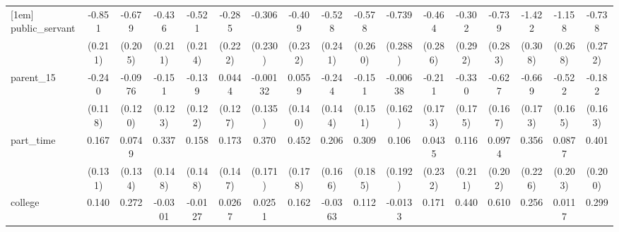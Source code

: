 {\begin{tabular}{l*{16}{c}}
[1em]
public\_servant      &      -0.851\sym{***}&      -0.679\sym{***}&      -0.436\sym{*}  &      -0.521\sym{*}  &      -0.285         &      -0.306         &      -0.409         &      -0.528\sym{*}  &      -0.578\sym{*}  &      -0.739\sym{*}  &      -0.464         &      -0.302         &      -0.739\sym{**} &      -1.422\sym{***}&      -1.158\sym{***}&      -0.738\sym{**} \\
                    &     (0.211)         &     (0.205)         &     (0.211)         &     (0.214)         &     (0.222)         &     (0.230)         &     (0.232)         &     (0.241)         &     (0.260)         &     (0.288)         &     (0.286)         &     (0.292)         &     (0.283)         &     (0.308)         &     (0.268)         &     (0.272)         \\
[1em]
parent\_15           &      -0.240\sym{*}  &     -0.0976         &      -0.151         &      -0.139         &      0.0444         &    -0.00132         &      0.0559         &      -0.244         &      -0.151         &    -0.00638         &      -0.211         &      -0.330         &      -0.627\sym{***}&      -0.669\sym{***}&      -0.522\sym{**} &      -0.182         \\
                    &     (0.118)         &     (0.120)         &     (0.123)         &     (0.122)         &     (0.127)         &     (0.135)         &     (0.140)         &     (0.144)         &     (0.151)         &     (0.162)         &     (0.173)         &     (0.175)         &     (0.167)         &     (0.173)         &     (0.165)         &     (0.163)         \\
[1em]
part\_time           &       0.167         &      0.0749         &       0.337\sym{*}  &       0.158         &       0.173         &       0.370\sym{*}  &       0.452\sym{*}  &       0.206         &       0.309         &       0.106         &      0.0435         &       0.116         &      0.0974         &       0.356         &      0.0877         &       0.401\sym{*}  \\
                    &     (0.131)         &     (0.134)         &     (0.148)         &     (0.148)         &     (0.147)         &     (0.171)         &     (0.178)         &     (0.166)         &     (0.185)         &     (0.192)         &     (0.232)         &     (0.211)         &     (0.202)         &     (0.226)         &     (0.203)         &     (0.200)         \\
[1em]
college             &       0.140         &       0.272         &     -0.0301         &     -0.0127         &      0.0267         &      0.0251         &       0.162         &     -0.0363         &       0.112         &     -0.0133         &       0.171         &       0.440\sym{*}  &       0.610\sym{**} &       0.256         &      0.0117         &       0.299         \\

\end{tabular}}
